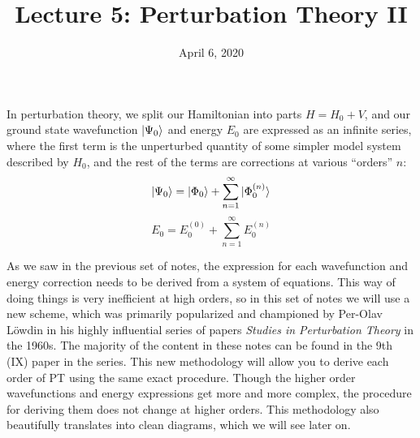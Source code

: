 \documentclass{article}
\title{Lecture 5: Perturbation Theory II}
\date{April 6, 2020}
\newcommand{\Ezero}{E^{(0)}}
\newcommand{\En}{E^{(n)}}
\newcommand{\Phin}{\Phi^{(n)}}
\begin{document}
\maketitle
\noindent

In perturbation theory, we split our Hamiltonian into parts $H = H_0 + V$, and our ground 
state wavefunction $\ket{\Psi_0}$ and energy $E_0$ are expressed as an infinite series, where the first term is the unperturbed
quantity of some simpler model system described by $H_0$, and the rest of the terms
are corrections at various ``orders'' $n$:
\[\ket{\Psi_0} = \ket{\Phi_0} + \sum_{n=1}^{\infty} \ket{\Phin_0} \]
\[E_0 = \Ezero_0 + \sum_{n=1}^{\infty} \En_0\]

As we saw in the previous set of notes, the expression for each wavefunction and energy correction 
    needs to be derived from a system of equations.
This way of doing things is very inefficient at high orders, so in this set of notes 
    we will use a new scheme, which was primarily popularized and championed by Per-Olav L{\"o}wdin
    in his highly influential series of papers \textit{Studies in Perturbation Theory} in the 1960s.
The majority of the content in these notes can be found in the 9th (IX) paper in the series.
This new methodology will allow you to derive each order of PT using the same exact procedure. 
Though the higher order wavefunctions and energy expressions get more and more complex,
the procedure for deriving them does not change at higher orders.
This methodology also beautifully translates into clean diagrams, which we will see later on.

\end{document}
